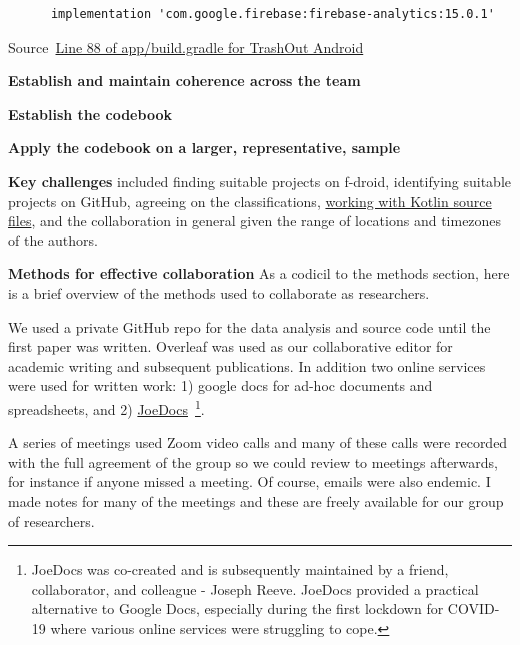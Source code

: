 \begin{listing}
\begin{verbatim}
      implementation 'com.google.firebase:firebase-analytics:15.0.1'
\end{verbatim}
\caption{Source~\href{https://github.com/TrashOut/Android/blob/e897c1c05629f3f5da23516fdfbd24870f773166/app/build.gradle\#L88}{Line 88 of app/build.gradle for TrashOut Android}}
\label{listing:trashout_ancient_firebaseanalytics_version}
\end{listing}

\textbf{Establish and maintain coherence across the team}


\textbf{Establish the codebook}

\textbf{Apply the codebook on a larger, representative, sample}


\textbf{Key challenges} included finding suitable projects on f-droid, identifying suitable projects on GitHub, agreeing on the classifications, \href{subsection_srcml_working_with_kotlin_files}{working with Kotlin source files}, and the collaboration in general given the range of locations and timezones of the authors. 

\textbf{Methods for effective collaboration}
As a codicil to the methods section, here is a brief overview of the methods used to collaborate as researchers. 

We used a private GitHub repo for the data analysis and source code until the first paper was written. Overleaf was used as our collaborative editor for academic writing and subsequent publications. In addition two online services were used for written work: 1) google docs for ad-hoc documents and spreadsheets, and 2) \href{https://joedocs.com/}{JoeDocs}~\footnote{JoeDocs was co-created and is subsequently maintained by a friend, collaborator, and colleague - Joseph Reeve. JoeDocs provided a practical alternative to Google Docs, especially during the first lockdown for COVID-19 where various online services were struggling to cope.}. 

A series of meetings used Zoom video calls and many of these calls were recorded with the full agreement of the group so we could review to meetings afterwards, for instance if anyone missed a meeting. Of course, emails were also endemic. I made notes for many of the meetings and these are freely available for our group of researchers.

